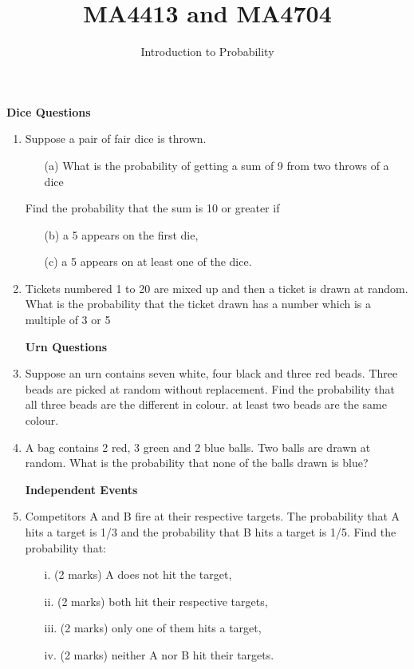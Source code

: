 \documentclass[12pt]{article}
\title{MA4413 and MA4704}
\author{Introduction to Probability}
\begin{document}
\maketitle
\textbf{\;\;\;Dice Questions}
\begin{enumerate}
\item 
Suppose a pair of fair dice is thrown. 
\begin{itemize}
\item[(a)] What is the probability of getting a sum of 9 from two throws of a dice
\end{itemize}
Find the probability that the sum is 10 or greater if
\begin{itemize}
\item[(b)] a 5 appears on the first die, 
\item[(c)] a 5 appears on at least one of the dice.
\end{itemize}



\item Tickets numbered 1 to 20 are mixed up and then a ticket is drawn at random. What is the probability that the ticket drawn has a number which is a multiple of 3 or 5

\bigskip 
\textbf{Urn Questions}
\item Suppose an urn contains seven white, four black and three red beads. Three beads are picked at random without replacement.
Find the probability that all three beads are the different in colour.
at least two beads are the same colour.

\item A bag contains 2 red, 3 green and 2 blue balls. Two balls are drawn at random. What is the probability that none of the balls drawn is blue?



\bigskip 
\textbf{Independent Events}
\item Competitors A and B fire at their respective targets. The probability that A hits a target is 1/3 and the probability that B hits a target is 1/5. Find the probability that:
\begin{itemize}
\item[i.] (2 marks) A does not hit the target,
\item[ii.](2 marks)  both hit their respective targets,
\item[iii.](2 marks)  only one of them hits a target,
\item[iv.](2 marks) neither A nor B hit their targets.
\end{itemize}


\end{enumerate}
\end{document}

